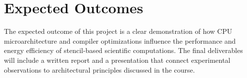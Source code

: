 \documentclass[11pt]{article}
\begin{document}
\section{Expected Outcomes}
The expected outcome of this project is a clear demonstration of how CPU microarchitecture and
compiler optimizations influence the performance and energy efficiency of stencil-based scientific
computations. The final deliverables will include a written report and a presentation that connect
experimental observations to architectural principles discussed in the course.
\end{document}
